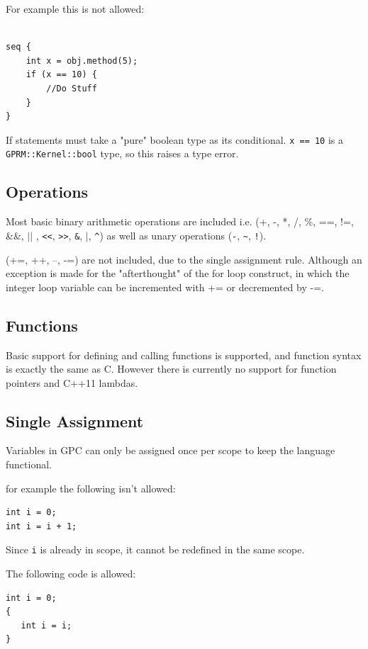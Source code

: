 For example this is not allowed:
\begin{lstlisting}[style=myGPC]

seq {
    int x = obj.method(5);
    if (x == 10) {
        //Do Stuff
    }    
}

\end{lstlisting}

If statements must take a "pure" boolean type as its conditional.
\texttt{x == 10} is a \texttt{GPRM::Kernel::bool} type, so this raises a type error.
  
\subsection{Operations}
        Most basic binary arithmetic operations are included i.e. 
        (+, -, *, /, \%, ==, !=, \&\&, $||$ , \lstinline|<<|, \lstinline|>>|, \lstinline|&|, $|$, 
        \lstinline|^|) as well as
        unary operations 
        (\lstinline|-|, \lstinline|~|, \lstinline|!|).

        (+=, ++, --, -=) are not included, due to the single assignment rule.
        Although an exception is made for the "afterthought" of the for loop construct, in which
        the integer loop variable can be incremented with += or decremented by -=.

\subsection{Functions}
 Basic support for defining and calling functions is supported, and function  
 syntax is exactly the same as C. However there is currently no
 support for function pointers and C++11 lambdas. 


\subsection{Single Assignment}
\label{sub:single}
Variables in GPC can only be assigned once per scope to keep
the language functional.

for example the following isn't allowed:

\begin{lstlisting}[style=myGPC]
int i = 0;
int i = i + 1;
\end{lstlisting}

Since \texttt{i} is already in scope, it cannot be redefined in the same scope.

The following code is allowed:

\begin{lstlisting}[style=myGPC]
int i = 0;
{
   int i = i;
}
\end{lstlisting}

